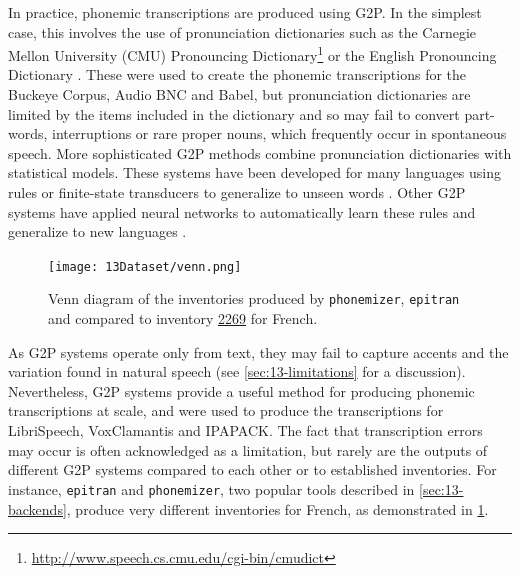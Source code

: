 In practice, phonemic transcriptions are produced using G2P. In the simplest case, this involves the use of pronunciation dictionaries such as the Carnegie Mellon University (CMU) Pronouncing Dictionary\footnote{\url{http://www.speech.cs.cmu.edu/cgi-bin/cmudict}} or the English Pronouncing Dictionary \citep{jones2011cambridge}. These were used to create the phonemic transcriptions for the Buckeye Corpus, Audio BNC and Babel, but pronunciation dictionaries are limited by the items included in the dictionary and so may fail to convert part-words, interruptions or rare proper nouns, which frequently occur in spontaneous speech. More sophisticated G2P methods combine pronunciation dictionaries with statistical models. These systems have been developed for many languages using rules or finite-state transducers to generalize to unseen words \citep{Mortensen-et-al:2018, johnson2020g2p, Bernard2021}. Other G2P systems have applied neural networks to automatically learn these rules and generalize to new languages \citep{NOVAK_MINEMATSU_HIROSE_2016, Zhu2022}.


\begin{figure}[t]
    \centering
    \texttt{[image: 13Dataset/venn.png]}
    \caption{Venn diagram of the inventories produced by \texttt{phonemizer}, \texttt{epitran} and \corpusphonemizer compared to \phoible inventory \href{https://phoible.org/inventories/view/2269}{2269} for French.}
    \label{fig:13-venn}
\end{figure}

As G2P systems operate only from text, they may fail to capture accents and the variation found in natural speech (see \cref{sec:13-limitations} for a discussion). Nevertheless, G2P systems provide a useful method for producing phonemic transcriptions at scale, and were used to produce the transcriptions for LibriSpeech, VoxClamantis and IPAPACK. The fact that transcription errors may occur is often acknowledged as a limitation, but rarely are the outputs of different G2P systems compared to each other or to established inventories. For instance, \texttt{epitran} and \texttt{phonemizer}, two popular tools described in \cref{sec:13-backends}, produce very different inventories for French, as demonstrated in \cref{fig:13-venn}. 


